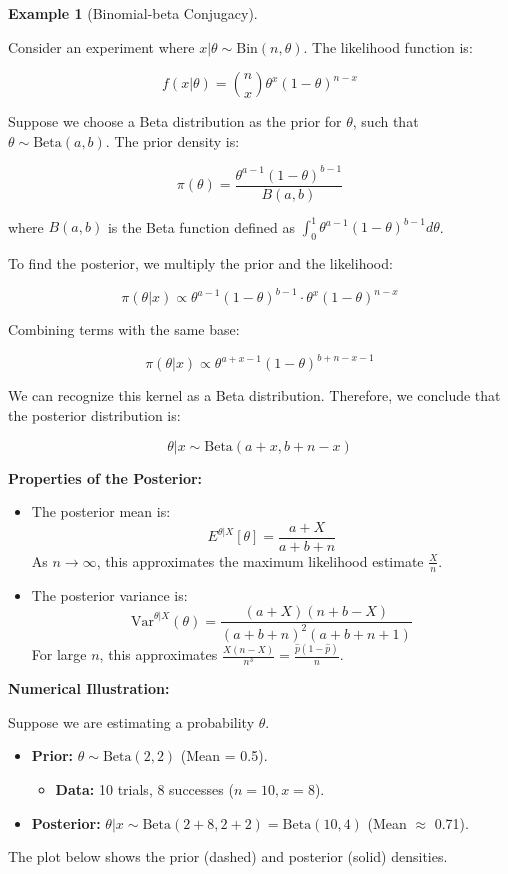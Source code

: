 \documentclass[
  letterpaper,
  DIV=11,
  numbers=noendperiod]{scrreprt}
\providecommand{\tightlist}{%
  \setlength{\itemsep}{0pt}\setlength{\parskip}{0pt}}
\renewcommand{\[}{\begin{equation}}
\renewcommand{\]}{\end{equation}}
\theoremstyle{definition}
\theoremstyle{plain}
\theoremstyle{plain}
\theoremstyle{plain}
\theoremstyle{definition}
\newtheorem{example}{Example}[chapter]
\theoremstyle{plain}
\theoremstyle{remark}
\begin{document}
\begin{example}[Binomial-beta
Conjugacy]\protect\hypertarget{exm-binomial-beta}{}\label{exm-binomial-beta}

Consider an experiment where \(x|\theta \sim \text{Bin}(n, \theta)\).
The likelihood function is:

\[
f(x|\theta) = \binom{n}{x} \theta^x (1-\theta)^{n-x}
\]

Suppose we choose a Beta distribution as the prior for \(\theta\), such
that \(\theta \sim \text{Beta}(a, b)\). The prior density is:

\[
\pi(\theta) = \frac{\theta^{a-1}(1-\theta)^{b-1}}{B(a,b)}
\]

where \(B(a,b)\) is the Beta function defined as
\(\int_{0}^{1} \theta^{a-1}(1-\theta)^{b-1} d\theta\).

To find the posterior, we multiply the prior and the likelihood:

\[
\pi(\theta|x) \propto \theta^{a-1}(1-\theta)^{b-1} \cdot \theta^x (1-\theta)^{n-x}
\]

Combining terms with the same base:

\[
\pi(\theta|x) \propto \theta^{a+x-1} (1-\theta)^{b+n-x-1}
\]

We can recognize this kernel as a Beta distribution. Therefore, we
conclude that the posterior distribution is:

\[
\theta|x \sim \text{Beta}(a+x, b+n-x)
\]

\textbf{Properties of the Posterior:}

\begin{itemize}
\item
  The posterior mean is: \[E^{\theta|X}[\theta] = \frac{a+X}{a+b+n}\] As
  \(n \to \infty\), this approximates the maximum likelihood estimate
  \(\frac{X}{n}\).
\item
  The posterior variance is:
  \[\text{Var}^{\theta|X}(\theta) = \frac{(a+X)(n+b-X)}{(a+b+n)^2(a+b+n+1)}\]
  For large \(n\), this approximates
  \(\frac{X(n-X)}{n^3} = \frac{\hat{p}(1-\hat{p})}{n}\).
\end{itemize}

\textbf{Numerical Illustration:}

Suppose we are estimating a probability \(\theta\).

\begin{itemize}
\tightlist
\item
  \textbf{Prior:} \(\theta \sim \text{Beta}(2, 2)\) (Mean = 0.5).

  \begin{itemize}
  \tightlist
  \item
    \textbf{Data:} 10 trials, 8 successes (\(n=10, x=8\)).
  \end{itemize}
\item
  \textbf{Posterior:}
  \(\theta|x \sim \text{Beta}(2+8, 2+2) = \text{Beta}(10, 4)\) (Mean
  \(\approx\) 0.71).
\end{itemize}

The plot below shows the prior (dashed) and posterior (solid) densities.

\end{example}
\end{document}
